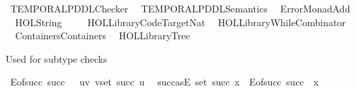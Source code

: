 %
\begin{isabellebody}%
%
%
\isadelimdocument
%
\endisadelimdocument
%
\isatagdocument
%
\isamarkuptrue%
%
\endisatagdocument
{\isafolddocument}%
%
\isadelimdocument
%
\endisadelimdocument
%
\isadelimtheory
%
\endisadelimtheory
%
\isatagtheory
{}\isamarkupfalse%
\ TEMPORAL{\isacharunderscore}{\kern0pt}PDDL{\isacharunderscore}{\kern0pt}Checker\isanewline
{}\isanewline
\ \ TEMPORAL{\isacharunderscore}{\kern0pt}PDDL{\isacharunderscore}{\kern0pt}Semantics\isanewline
\ \ Error{\isacharunderscore}{\kern0pt}Monad{\isacharunderscore}{\kern0pt}Add\isanewline
\ \ {\isachardoublequoteopen}HOL{\isachardot}{\kern0pt}String{\isachardoublequoteclose}\isanewline
\ \ \isanewline
\ \ {\isachardoublequoteopen}HOL{\isacharminus}{\kern0pt}Library{\isachardot}{\kern0pt}Code{\isacharunderscore}{\kern0pt}Target{\isacharunderscore}{\kern0pt}Nat{\isachardoublequoteclose}\isanewline
\ \ {\isachardoublequoteopen}HOL{\isacharminus}{\kern0pt}Library{\isachardot}{\kern0pt}While{\isacharunderscore}{\kern0pt}Combinator{\isachardoublequoteclose}\isanewline
\ \ {\isachardoublequoteopen}Containers{\isachardot}{\kern0pt}Containers{\isachardoublequoteclose}\isanewline
\isanewline
\ \ {\isachardoublequoteopen}HOL{\isacharminus}{\kern0pt}Library{\isachardot}{\kern0pt}Tree{\isachardoublequoteclose}\isanewline
{}%
\endisatagtheory
{\isafoldtheory}%
%
\isadelimtheory
%
\endisadelimtheory
%
\isadelimdocument
%
\endisadelimdocument
%
\isatagdocument
%
\isamarkuptrue%
%
\endisatagdocument
{\isafolddocument}%
%
\isadelimdocument
%
\endisadelimdocument
%
\begin{isamarkuptext}%
Used for subtype checks%
\end{isamarkuptext}\isamarkuptrue%
\isamarkupfalse%
\ {\isachardoublequoteopen}E{\isacharunderscore}{\kern0pt}of{\isacharunderscore}{\kern0pt}succ\ succ\ {\isasymequiv}\ {\isacharbraceleft}{\kern0pt}\ {\isacharparenleft}{\kern0pt}u{\isacharcomma}{\kern0pt}v{\isacharparenright}{\kern0pt}{\isachardot}{\kern0pt}\ v{\isasymin}set\ {\isacharparenleft}{\kern0pt}succ\ u{\isacharparenright}{\kern0pt}\ {\isacharbraceright}{\kern0pt}{\isachardoublequoteclose}\isanewline
{}\isamarkupfalse%
\ succ{\isacharunderscore}{\kern0pt}as{\isacharunderscore}{\kern0pt}E{\isacharcolon}{\kern0pt}\ {\isachardoublequoteopen}set\ {\isacharparenleft}{\kern0pt}succ\ x{\isacharparenright}{\kern0pt}\ {\isacharequal}{\kern0pt}\ E{\isacharunderscore}{\kern0pt}of{\isacharunderscore}{\kern0pt}succ\ succ\ {\isacharbackquote}{\kern0pt}{\isacharbackquote}{\kern0pt}\ {\isacharbraceleft}{\kern0pt}x{\isacharbraceright}{\kern0pt}{\isachardoublequoteclose}\isanewline

\end{isabellebody}
